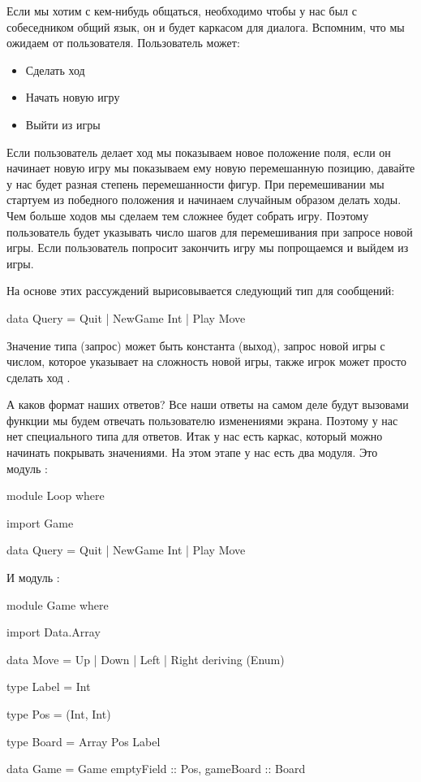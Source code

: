 Если мы хотим с кем-нибудь общаться, необходимо чтобы у нас был с
собеседником общий язык, он и будет каркасом для диалога. Вспомним, что
мы ожидаем от пользователя. Пользователь может:

\begin{itemize}
\item
  Сделать ход
\item
  Начать новую игру
\item
  Выйти из игры
\end{itemize}

Если пользователь делает ход мы показываем новое положение поля, если он
начинает новую игру мы показываем ему новую перемешанную позицию,
давайте у нас будет разная степень перемешанности фигур. При
перемешивании мы стартуем из победного положения и начинаем случайным
образом делать ходы. Чем больше ходов мы сделаем тем сложнее будет
собрать игру. Поэтому пользователь будет указывать число шагов для
перемешивания при запросе новой игры. Если пользователь попросит
закончить игру мы попрощаемся и выйдем из игры.

На основе этих рассуждений вырисовывается следующий тип для сообщений:


\begin{code}
data Query = Quit | NewGame Int | Play Move
\end{code}

Значение типа  (запрос) может быть константа 
(выход), запрос новой игры  с числом, которое указывает на
сложность новой игры, также игрок может просто сделать ход
.

А каков формат наших ответов? Все наши ответы на самом деле будут
вызовами функции  мы будем отвечать пользователю
изменениями экрана. Поэтому у нас нет специального типа для ответов.
Итак у нас есть каркас, который можно начинать покрывать значениями. На
этом этапе у нас есть два модуля. Это модуль :


\begin{code}
module Loop where

import Game

data Query = Quit | NewGame Int | Play Move
\end{code}

\noindent 

И модуль :


\begin{code}
module Game where

import Data.Array

data Move = Up | Down | Left | Right
    deriving (Enum)

type Label = Int

type Pos = (Int, Int)

type Board = Array Pos Label

data Game = Game {
        emptyField  :: Pos,
        gameBoard   :: Board }
\end{code}

